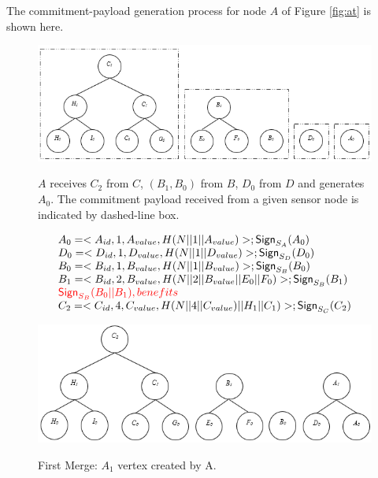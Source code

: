 			\begin{exmp} The commitment-payload generation process for node $A$ of Figure \ref{fig:at} is shown here.\\
				\begin{figure}[h!]
					\centering
					\includegraphics[width=6in]{images/commitment-tree-example-1.png}\\
					\caption{$A$ receives $C_{2}$ from $C$, $(B_{1},B_{0})$ from $B$, $D_{0}$ from $D$ and generates $A_{0}$. The commitment payload received from a given sensor node is indicated by dashed-line box.}
					\label{fig:commitment-tree-example-1}
				\end{figure}
				\begin{equation}
					\begin{array}{l}
						A_{0} = <A_{id}, 1, A_{value}, H(N||1||A_{value})>; \textsf{Sign}_{S_{A}}(A_{0}) \\
						D_{0} = <D_{id}, 1, D_{value}, H(N||1||D_{value})>; \textsf{Sign}_{S_{D}}(D_{0})\\
						B_{0} = <B_{id}, 1, B_{value}, H(N||1||B_{value})>; \textsf{Sign}_{S_{B}}(B_{0})\\
						B_{1} = <B_{id}, 2, B_{value}, H(N||2||B_{value}||E_{0}||F_{0})>; \textsf{Sign}_{S_{B}}(B_{1})\\
						\textcolor{red}{\textsf{Sign}_{S_{B}}(B_{0} || B_{1}), benefits}\\
						C_{2} = <C_{id}, 4, C_{value}, H(N||4||C_{value})||H_{1}||C_{1})>; \textsf{Sign}_{S_{C}}(C_{2})\\
						\end{array}
				\end{equation}

				\begin{figure}[h!]
					\centering
					\includegraphics[width=6in]{images/commitment-tree-example-2.png}\\
					\caption{First Merge: $A_{1}$ vertex created by A.}
					\label{fig:commitment-tree-example-2}
				\end{figure}


\end{exmp}
